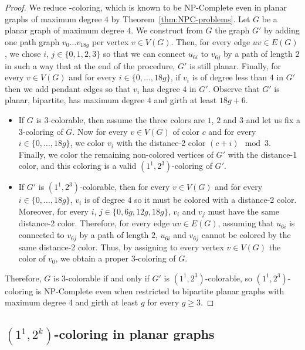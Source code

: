 \documentclass{article}
\newcommand{\colo}[2]{(1^{#1}, 2^{#2})}
\begin{document}
\begin{proof}
    We reduce {-coloring}, which is known to be NP-Complete even in planar graphs of maximum degree $4$ by Theorem~\ref{thm:NPC-problems}. Let $G$ be a planar graph of maximum degree $4$. 
    We construct from $G$ the graph $G'$ by adding one path graph $v_0\dots v_{18g}$ per vertex $v \in V(G)$. Then, for every edge $uv \in E(G)$, we chose $i$, $j \in \{0, 1, 2, 3\}$ so that we can connect $u_{6i}$ to $v_{6j}$ by a path of length $2$ in such a way that at the end of the procedure, $G'$ is still planar. 
    Finally, for every $v \in V(G)$ and for every $i \in \{0, \dots, 18g\}$, if $v_i$ is of degree less than $4$ in $G'$ then we add pendant edges so that $v_i$ has degree $4$ in $G'$. Observe that $G'$ is planar, bipartite, has maximum degree $4$ and girth at least $18g + 6$.
    \begin{itemize}
        \item If $G$ is $3$-colorable, then assume the three colors are $1$, $2$ and $3$ and let us fix a $3$-coloring of $G$. Now for every $v \in V(G)$ of color $c$ and for every $i \in \{0, \dots, 18g\}$, we color $v_i$ with the distance-2 color $(c + i)\mod 3$. Finally, we color the remaining non-colored vertices of $G'$ with the distance-1 color, and this coloring is a valid $\colo{1}{3}$-coloring of $G'$.
        \item If $G'$ is $\colo{1}{3}$-colorable, then for every $v \in V(G)$ and for every $i \in \{0, \dots, 18g\}$, $v_i$ is of degree $4$ so it must be colored with a distance-2 color. Moreover, for every $i$, $j \in \{0, 6g, 12g, 18g\}$, $v_i$ and $v_j$ must have the same distance-2 color.
        Therefore, for every edge $uv \in E(G)$, assuming that $u_{6i}$ is connected to $v_{6j}$ by a path of length $2$, $u_{6i}$ and $v_{6j}$ cannot be colored by the same distance-2 color.
        Thus, by assigning to every vertex $v \in V(G)$ the color of $v_0$, we obtain a proper $3$-coloring of $G$.
    \end{itemize}
    Therefore, $G$ is $3$-colorable if and only if $G'$ is $\colo{1}{3}$-colorable, so {\sc $\colo{1}{3}$-coloring} is NP-Complete even when restricted to bipartite planar graphs with maximum degree 4 and girth at least $g$ for every $g\geq 3$.
\end{proof}

\subsection{{\sc $\colo{1}{k}$-coloring} in planar graphs}
\end{document}
